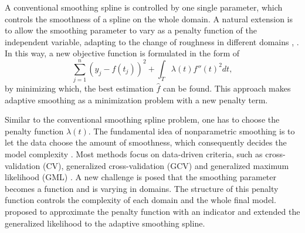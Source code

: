 



A conventional smoothing spline is controlled by one single parameter, which controls the smoothness of a spline on the whole domain. A natural extension is to allow the smoothing parameter to vary as a penalty function of the independent variable, adapting to the change of roughness in different domains \cite{silverman1985some}, \cite{donoho1995wavelet}. In this way, a new objective function is formulated in the form of 
\begin{equation}\label{objective}
\sum_{j=1}^{n}(y_j-f(t_j))^2+\int_T\lambda(t) f''(t)^2 dt,
\end{equation}
by minimizing which, the best estimation $\hat{f}$ can be found. This approach makes adaptive smoothing as a minimization problem with a new penalty term. 


Similar to the conventional smoothing spline problem, one has to choose the penalty function $\lambda(t)$. The fundamental idea of nonparametric smoothing is to let the data choose the amount of smoothness, which consequently decides the model complexity \cite{gu1998model}. Most methods focus on data-driven criteria, such as cross-validation (CV), generalized cross-validation (GCV) \cite{craven1978smoothing} and generalized maximum likelihood (GML) \cite{wahba1985comparison}. A new challenge is posed that the smoothing parameter becomes a function and is varying in domains. The structure of this penalty function controls the complexity of each domain and the whole final model. \cite{liu2010data} proposed to approximate the penalty function with an indicator and extended the generalized likelihood to the adaptive smoothing spline.



